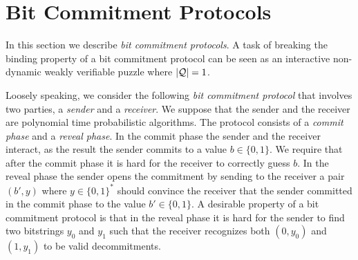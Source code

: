 \section{Bit Commitment Protocols}
\label{section:bc}
In this section we describe \textit{bit commitment protocols}. A task of breaking the binding property of
a bit commitment protocol can be seen as an interactive non-dynamic weakly verifiable puzzle where $|\mathcal{Q}| = 1$.

Loosely speaking, we consider the following \textit{bit commitment protocol} that involves two parties, a \textit{sender} and a \textit{receiver}.
We suppose that the sender and the receiver are polynomial time probabilistic algorithms.
The protocol consists of a \textit{commit phase} and a \textit{reveal phase}.
In the commit phase the sender and the receiver interact, as the result the sender commits to a value $b \in \{0,1\}$.
We require that after the commit phase it is hard for the receiver to correctly guess $b$.
In the reveal phase the sender opens the commitment by sending to the receiver a pair $(b', y)$ where $y \in \{0,1\}^{*}$
should convince the receiver that the sender committed in the commit phase to the value $b' \in \{0,1\}$.
A desirable property of a bit commitment protocol is that in the reveal phase it is hard for
the sender to find two bitstrings $y_0$ and $y_1$ such that the receiver recognizes both $(0,y_0)$ and $(1, y_1)$ to be valid decommitments.

